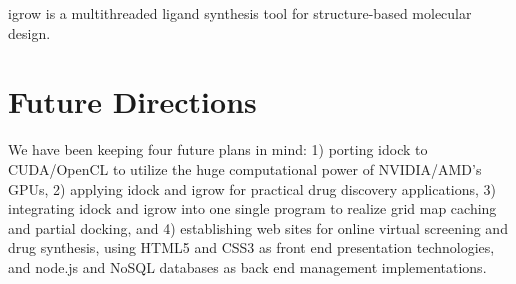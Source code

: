 \documentclass[10pt, conference, compsocconf]{../IEEEtran}
\begin{document}
igrow is a multithreaded ligand synthesis tool for structure-based molecular design.

\section{Future Directions}

We have been keeping four future plans in mind: 1) porting idock to CUDA/OpenCL to utilize the huge computational power of NVIDIA/AMD's GPUs, 2) applying idock and igrow for practical drug discovery applications, 3) integrating idock and igrow into one single program to realize grid map caching and partial docking, and 4) establishing web sites for online virtual screening and drug synthesis, using HTML5 and CSS3 as front end presentation technologies, and node.js and NoSQL databases as back end management implementations.



\end{document}
